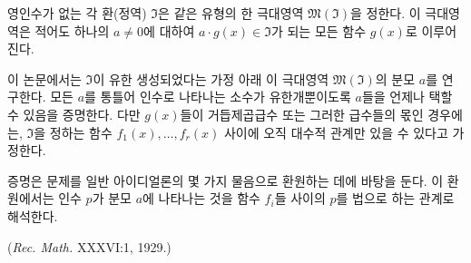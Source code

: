 영인수가 없는 각 환(정역) \(\mathfrak I\)은 같은 유형의 한 극대영역 \(\mathfrak M(\mathfrak I)\)을 정한다. 이 극대영역은 적어도 하나의 \(a\ne0\)에 대하여 \(a\cdot g(x)\in\mathfrak I\)가 되는 모든 함수 \(g(x)\)로 이루어진다.

이 논문에서는 \(\mathfrak I\)이 유한 생성되었다는 가정 아래 이 극대영역 \(\mathfrak M(\mathfrak I)\)의 \glqq{}분모\grqq{} \(a\)를 연구한다. 모든 \(a\)를 통틀어 인수로 나타나는 소수가 유한개뿐이도록 \(a\)들을 언제나 택할 수 있음을 증명한다. 다만 \(g(x)\)들이 거듭제곱급수 또는 그러한 급수들의 몫인 경우에는, \(\mathfrak I\)을 정하는 함수 \(f_1(x),\ldots,f_r(x)\) 사이에 오직 대수적 관계만 있을 수 있다고 가정한다.

증명은 문제를 일반 아이디얼론의 몇 가지 물음으로 환원하는 데에 바탕을 둔다. 이 환원에서는 인수 \(p\)가 분모 \(a\)에 나타나는 것을 함수 \(f_i\)들 사이의 \(p\)를 법으로 하는 관계로 해석한다.

\begin{center}
(\emph{Rec. Math.} XXXVI:1, 1929.)
\end{center}
